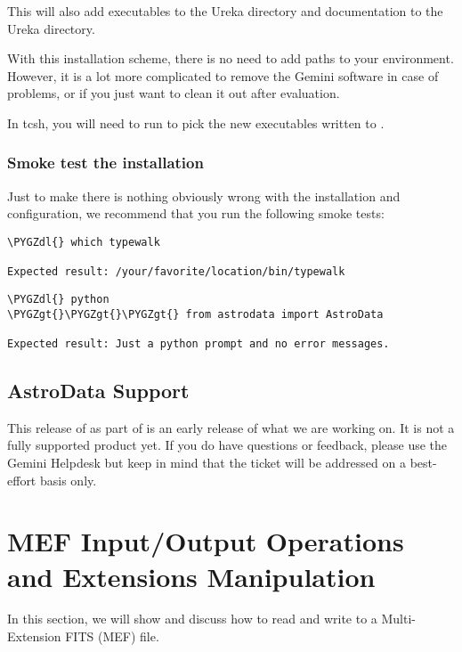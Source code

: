 \documentclass[letterpaper,10pt,english]{sphinxmanual}
\def\PYGZgt{\char`\>}
\def\PYGZdl{\char`\$}
\begin{document}
This will also add executables to the Ureka  directory and documentation to
the Ureka  directory.

With this installation scheme, there is no need to add paths to your environment.
However, it is a lot more complicated to remove the Gemini software in case of
problems, or if you just want to clean it out after evaluation.

In tcsh, you will need to run  to pick the new executables written to .


\subsection{Smoke test the installation}
\label{intro:smoke-test-the-installation}
Just to make there is nothing obviously wrong with the installation and configuration,
we recommend that you run the following smoke tests:

\begin{Verbatim}[commandchars=\\\{\}]
\PYGZdl{} which typewalk

Expected result: /your/favorite/location/bin/typewalk
\end{Verbatim}

\begin{Verbatim}[commandchars=\\\{\}]
\PYGZdl{} python
\PYGZgt{}\PYGZgt{}\PYGZgt{} from astrodata import AstroData

Expected result: Just a python prompt and no error messages.
\end{Verbatim}


\section{AstroData Support}
\label{intro:astrodata-support}
This release of  as part of  is an early release of what
we are working on.  It is not a fully supported product yet.  If you do have questions or
feedback, please use the Gemini Helpdesk but keep in mind that the ticket will be addressed
on a best-effort basis only.


\chapter{MEF Input/Output Operations and Extensions Manipulation}
\label{io:mef-input-output-operations-and-extensions-manipulation}\label{io::doc}\label{io:io}
In this section, we will show and discuss how to read and write to a
Multi-Extension FITS (MEF) file.
\end{document}
